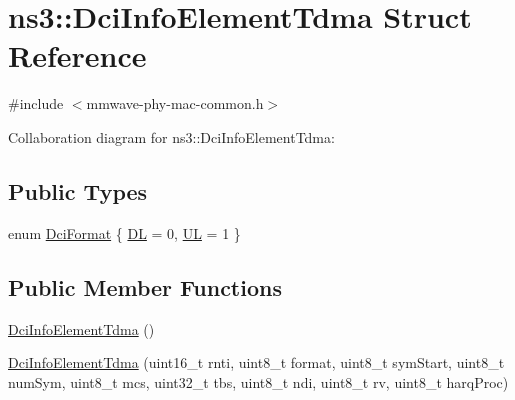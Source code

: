 \hypertarget{structns3_1_1DciInfoElementTdma}{}\section{ns3\+:\+:Dci\+Info\+Element\+Tdma Struct Reference}
\label{structns3_1_1DciInfoElementTdma}


{\ttfamily \#include $<$mmwave-\/phy-\/mac-\/common.\+h$>$}



Collaboration diagram for ns3\+:\+:Dci\+Info\+Element\+Tdma\+:
\subsection*{Public Types}
\begin{DoxyCompactItemize}
\item 
enum \hyperlink{structns3_1_1DciInfoElementTdma_af998ccd3b1e03836c113d353facc76f4}{Dci\+Format} \{ \hyperlink{structns3_1_1DciInfoElementTdma_af998ccd3b1e03836c113d353facc76f4a6497273a219b44fa44ea3a6ea608bfcb}{DL} = 0, 
\hyperlink{structns3_1_1DciInfoElementTdma_af998ccd3b1e03836c113d353facc76f4a8611bf12ef88d043baf0e591bc63b314}{UL} = 1
 \}
\end{DoxyCompactItemize}
\subsection*{Public Member Functions}
\begin{DoxyCompactItemize}
\item 
\hyperlink{structns3_1_1DciInfoElementTdma_aec3f1dde85bac52f69dd0586805c76a3}{Dci\+Info\+Element\+Tdma} ()
\item 
\hyperlink{structns3_1_1DciInfoElementTdma_a52a86d6a0f99a23a8a98b27eb927fb46}{Dci\+Info\+Element\+Tdma} (uint16\+\_\+t rnti, uint8\+\_\+t format, uint8\+\_\+t sym\+Start, uint8\+\_\+t num\+Sym, uint8\+\_\+t mcs, uint32\+\_\+t tbs, uint8\+\_\+t ndi, uint8\+\_\+t rv, uint8\+\_\+t harq\+Proc)
\end{DoxyCompactItemize}
